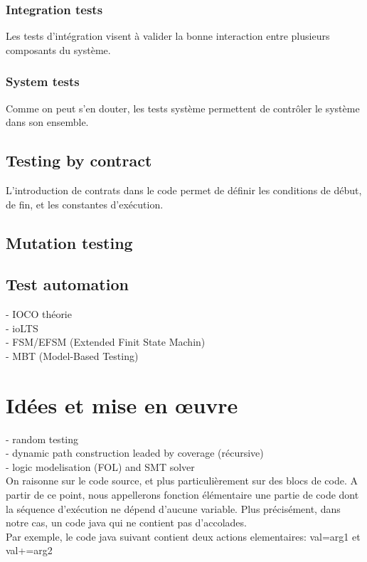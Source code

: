 \documentclass[a4paper]{report}
\begin{document}
\subsection*{Integration tests}
Les tests d'intégration visent à valider la bonne interaction entre plusieurs composants du système.

\subsection*{System tests}
Comme on peut s'en douter, les tests système permettent de contrôler le système dans son ensemble.

\section*{Testing by contract}
L'introduction de contrats dans le code permet de définir les conditions de début, de fin, et les constantes d'exécution.
\section*{Mutation testing}

\section*{Test automation}
- IOCO théorie\\
- ioLTS\\
- FSM/EFSM (Extended Finit State Machin)\\
- MBT (Model-Based Testing)\\





\chapter*{Idées et mise en œuvre}
- random testing\\
- dynamic path construction leaded by coverage (récursive)\\
- logic modelisation (FOL) and SMT solver\\

On raisonne sur le code source, et plus particulièrement sur des blocs de code. A partir de ce point, nous appellerons fonction élémentaire une partie de code dont la séquence d'exécution ne dépend d'aucune variable. Plus précisément, dans notre cas, un code java qui ne contient pas d'accolades.\\
\newline
Par exemple, le code java suivant contient deux actions elementaires: val=arg1 et val+=arg2\\
\end{document}
